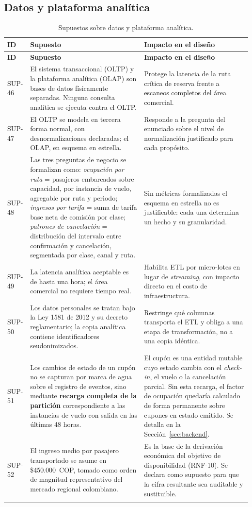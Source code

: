 \documentclass[10pt,letterpaper]{article}
\begin{document}
\subsection{Datos y plataforma analítica}
\begin{longtable}{@{}L{1.7cm} L{7.4cm} L{6.1cm}@{}}
\toprule
\textbf{ID} & \textbf{Supuesto} & \textbf{Impacto en el diseño} \\
\midrule
\endfirsthead
\toprule
\textbf{ID} & \textbf{Supuesto} & \textbf{Impacto en el diseño} \\
\midrule
\endhead
SUP-46 & El sistema transaccional (OLTP) y la plataforma analítica (OLAP) son bases de datos físicamente separadas. Ninguna consulta analítica se ejecuta contra el OLTP. & Protege la latencia de la ruta crítica de reserva frente a escaneos completos del área comercial. \\
SUP-47 & El OLTP se modela en tercera forma normal, con desnormalizaciones declaradas; el OLAP, en esquema en estrella. & Responde a la pregunta del enunciado sobre el nivel de normalización justificado para cada propósito. \\
SUP-48 & Las tres preguntas de negocio se formalizan como: \emph{ocupación por ruta} = pasajeros embarcados sobre capacidad, por instancia de vuelo, agregable por ruta y periodo; \emph{ingresos por tarifa} = suma de tarifa base neta de comisión por clase; \emph{patrones de cancelación} = distribución del intervalo entre confirmación y cancelación, segmentada por clase, canal y ruta. & Sin métricas formalizadas el esquema en estrella no es justificable: cada una determina un hecho y su granularidad. \\
SUP-49 & La latencia analítica aceptable es de hasta una hora; el área comercial no requiere tiempo real. & Habilita ETL por micro-lotes en lugar de \emph{streaming}, con impacto directo en el costo de infraestructura. \\
SUP-50 & Los datos personales se tratan bajo la Ley 1581 de 2012 y su decreto reglamentario; la copia analítica contiene identificadores seudonimizados. & Restringe qué columnas transporta el ETL y obliga a una etapa de transformación, no a una copia idéntica. \\
SUP-51 & Los cambios de estado de un cupón no se capturan por marca de agua sobre el registro de eventos, sino mediante \textbf{recarga completa de la partición} correspondiente a las instancias de vuelo con salida en las últimas 48 horas. & El cupón es una entidad mutable cuyo estado cambia con el \emph{check-in}, el vuelo o la cancelación parcial. Sin esta recarga, el factor de ocupación quedaría calculado de forma permanente sobre cupones en estado emitido. Se detalla en la Sección~\ref{sec:backend}. \\
SUP-52 & El ingreso medio por pasajero transportado se asume en \$450.000~COP, tomado como orden de magnitud representativo del mercado regional colombiano. & Es la base de la derivación económica del objetivo de disponibilidad (RNF-10). Se declara como supuesto para que la cifra resultante sea auditable y sustituible. \\
\bottomrule
\caption{Supuestos sobre datos y plataforma analítica.}
\end{longtable}
\end{document}
